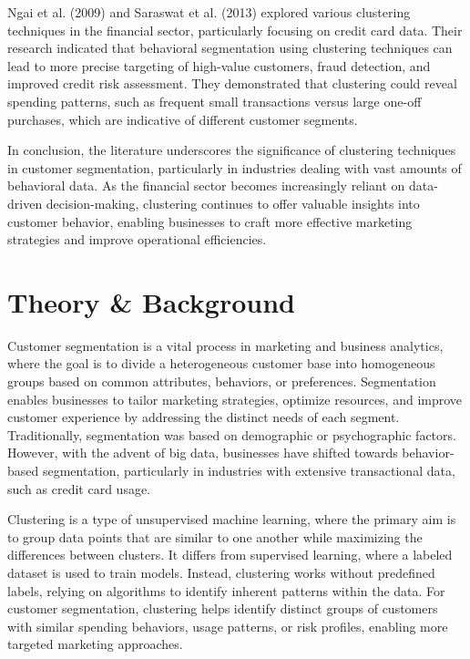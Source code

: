 \documentclass[runningheads,a4paper]{llncs}
\begin{document}
Ngai et al. (2009) and Saraswat et al. (2013) explored various clustering techniques in the financial sector, particularly focusing on credit card data. Their research indicated that behavioral segmentation using clustering techniques can lead to more precise targeting of high-value customers, fraud detection, and improved credit risk assessment. They demonstrated that clustering could reveal spending patterns, such as frequent small transactions versus large one-off purchases, which are indicative of different customer segments.

In conclusion, the literature underscores the significance of clustering techniques in customer segmentation, particularly in industries dealing with vast amounts of behavioral data. As the financial sector becomes increasingly reliant on data-driven decision-making, clustering continues to offer valuable insights into customer behavior, enabling businesses to craft more effective marketing strategies and improve operational efficiencies.


\section{Theory \& Background}

Customer segmentation is a vital process in marketing and business analytics, where the goal is to divide a heterogeneous customer base into homogeneous groups based on common attributes, behaviors, or preferences. Segmentation enables businesses to tailor marketing strategies, optimize resources, and improve customer experience by addressing the distinct needs of each segment. Traditionally, segmentation was based on demographic or psychographic factors. However, with the advent of big data, businesses have shifted towards behavior-based segmentation, particularly in industries with extensive transactional data, such as credit card usage.

Clustering is a type of unsupervised machine learning, where the primary aim is to group data points that are similar to one another while maximizing the differences between clusters. It differs from supervised learning, where a labeled dataset is used to train models. Instead, clustering works without predefined labels, relying on algorithms to identify inherent patterns within the data. For customer segmentation, clustering helps identify distinct groups of customers with similar spending behaviors, usage patterns, or risk profiles, enabling more targeted marketing approaches.
\end{document}
